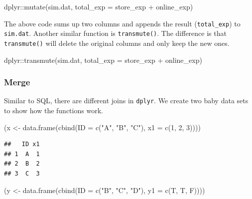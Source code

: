 \documentclass[
  12pt,
]{krantz}
\makeatletter
\newenvironment{Shaded}{\begin{snugshade}}{\end{snugshade}}
\newcommand{\AttributeTok}[1]{\textcolor[rgb]{0.61,0.61,0.61}{#1}}
\newcommand{\DecValTok}[1]{\textcolor[rgb]{0.06,0.06,0.06}{#1}}
\newcommand{\FunctionTok}[1]{\textcolor[rgb]{0,0,0}{#1}}
\newcommand{\NormalTok}[1]{#1}
\newcommand{\OtherTok}[1]{\textcolor[rgb]{0.37,0.37,0.37}{#1}}
\newcommand{\SpecialCharTok}[1]{\textcolor[rgb]{0,0,0}{#1}}
\newcommand{\StringTok}[1]{\textcolor[rgb]{0.5,0.5,0.5}{#1}}
\newenvironment{kframe}{%
\medskip{}
\setlength{\fboxsep}{.8em}
 \def\at@end@of@kframe{}%
 \ifinner\ifhmode%
  \def\at@end@of@kframe{\end{minipage}}%
  \begin{minipage}{\columnwidth}%
 \fi\fi%
 \def\FrameCommand##1{\hskip\@totalleftmargin \hskip-\fboxsep
 \colorbox{shadecolor}{##1}\hskip-\fboxsep
     \hskip-\linewidth \hskip-\@totalleftmargin \hskip\columnwidth}%
 \MakeFramed {\advance\hsize-\width
   \@totalleftmargin\z@ \linewidth\hsize
   \@setminipage}}%
 {\par\unskip\endMakeFramed%
 \at@end@of@kframe}
\renewenvironment{Shaded}{\begin{kframe}}{\end{kframe}}
\makeatother
\begin{document}
\begin{Shaded}
\begin{Highlighting}[]
\NormalTok{dplyr}\SpecialCharTok{::}\FunctionTok{mutate}\NormalTok{(sim.dat, }\AttributeTok{total\_exp =}\NormalTok{ store\_exp }\SpecialCharTok{+}\NormalTok{ online\_exp)}
\end{Highlighting}
\end{Shaded}

The above code sums up two columns and appends the result (\texttt{total\_exp}) to \texttt{sim.dat}. Another similar function is \texttt{transmute()}. The difference is that \texttt{transmute()} will delete the original columns and only keep the new ones.

\begin{Shaded}
\begin{Highlighting}[]
\NormalTok{dplyr}\SpecialCharTok{::}\FunctionTok{transmute}\NormalTok{(sim.dat, }\AttributeTok{total\_exp =}\NormalTok{ store\_exp }\SpecialCharTok{+}\NormalTok{ online\_exp)}
\end{Highlighting}
\end{Shaded}

\hypertarget{merge}{%
\subsubsection{Merge}\label{merge}}

Similar to SQL, there are different joins in \texttt{dplyr}. We create two baby data sets to show how the functions work.

\begin{Shaded}
\begin{Highlighting}[]
\NormalTok{(x }\OtherTok{\textless{}{-}} \FunctionTok{data.frame}\NormalTok{(}\FunctionTok{cbind}\NormalTok{(}\AttributeTok{ID =} \FunctionTok{c}\NormalTok{(}\StringTok{"A"}\NormalTok{, }\StringTok{"B"}\NormalTok{, }\StringTok{"C"}\NormalTok{), }\AttributeTok{x1 =} \FunctionTok{c}\NormalTok{(}\DecValTok{1}\NormalTok{, }\DecValTok{2}\NormalTok{, }\DecValTok{3}\NormalTok{))))}
\end{Highlighting}
\end{Shaded}

\begin{verbatim}
##   ID x1
## 1  A  1
## 2  B  2
## 3  C  3
\end{verbatim}

\begin{Shaded}
\begin{Highlighting}[]
\NormalTok{(y }\OtherTok{\textless{}{-}} \FunctionTok{data.frame}\NormalTok{(}\FunctionTok{cbind}\NormalTok{(}\AttributeTok{ID =} \FunctionTok{c}\NormalTok{(}\StringTok{"B"}\NormalTok{, }\StringTok{"C"}\NormalTok{, }\StringTok{"D"}\NormalTok{), }\AttributeTok{y1 =} \FunctionTok{c}\NormalTok{(T, T, F))))}
\end{Highlighting}
\end{Shaded}
\end{document}
